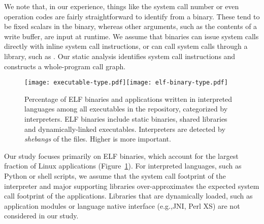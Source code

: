 We note that, in our experience, things like the system call number or even operation codes are fairly straightforward
to identify from a binary.  These tend to be fixed scalars in the binary, whereas other arguments, such as the contents of a write buffer,
are input at runtime.
We assume that binaries can issue system calls directly with inline system call instructions, or can call system calls through a library, such as \libc{}.
Our static analysis identifies system call instructions and constructs a whole-program call graph.

\begin{figure}[t!]
\centering
\texttt{[image: executable-type.pdf]}\texttt{[image: elf-binary-type.pdf]}
\vspace{-0.5in}
\footnotesize
\caption{Percentage of ELF binaries and applications written in interpreted languages among all executables in the \osdist{} repository, categorized by interpreters. ELF binaries include static binaries, shared libraries and dynamically-linked executables. Interpreters are detected by {\em shebangs} of the files. Higher is more important.}
\label{fig:syspop:executable-type}
\end{figure}

Our study focuses primarily on ELF binaries, which account for the largest fraction of Linux applications
(Figure~\ref{fig:syspop:executable-type}).
For interpreted languages, such as Python or shell scripts,
we assume that the system call footprint of the interpreter and major supporting libraries over-approximates the expected system call footprint of the applications.
Libraries that are dynamically loaded, such as application modules or
language native interface (e.g.,JNI, Perl XS) are not considered in our study. 


